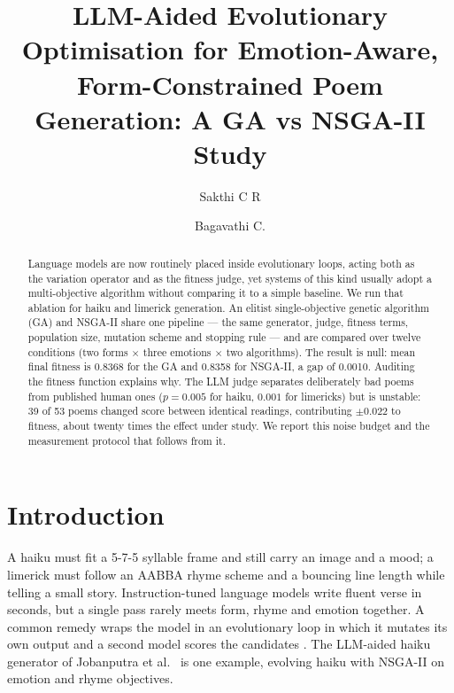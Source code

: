 \documentclass[sigconf,nonacm]{acmart}
\begin{document}
\title{LLM-Aided Evolutionary Optimisation for Emotion-Aware, Form-Constrained Poem Generation: A GA vs NSGA-II Study}

\author{Sakthi C R}

\author{Bagavathi C.}

\begin{abstract}
Language models are now routinely placed inside evolutionary loops, acting both as the variation operator and as the fitness judge, yet systems of this kind usually adopt a multi-objective algorithm without comparing it to a simple baseline. We run that ablation for haiku and limerick generation. An elitist single-objective genetic algorithm (GA) and NSGA-II share one pipeline --- the same generator, judge, fitness terms, population size, mutation scheme and stopping rule --- and are compared over twelve conditions (two forms $\times$ three emotions $\times$ two algorithms). The result is null: mean final fitness is 0.8368 for the GA and 0.8358 for NSGA-II, a gap of 0.0010. Auditing the fitness function explains why. The LLM judge separates deliberately bad poems from published human ones ($p=0.005$ for haiku, $0.001$ for limericks) but is unstable: 39 of 53 poems changed score between identical readings, contributing $\pm0.022$ to fitness, about twenty times the effect under study. We report this noise budget and the measurement protocol that follows from it.
\end{abstract}


\maketitle

\section{Introduction}
A haiku must fit a 5-7-5 syllable frame and still carry an image and a mood; a limerick must follow an AABBA rhyme scheme and a bouncing line length while telling a small story. Instruction-tuned language models write fluent verse in seconds, but a single pass rarely meets form, rhyme and emotion together. A common remedy wraps the model in an evolutionary loop in which it mutates its own output and a second model scores the candidates \cite{lehman2022,meyerson2024,bradley2024}. The LLM-aided haiku generator of Jobanputra et al.\ \cite{jobanputra2025} is one example, evolving haiku with NSGA-II on emotion and rhyme objectives.
\end{document}
